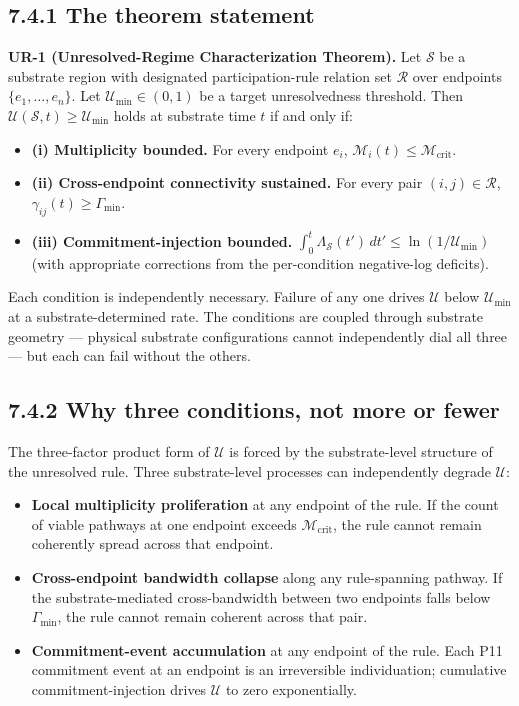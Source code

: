 \documentclass[11pt]{book}
\begin{document}
\subsection{7.4.1 The theorem statement}

\textbf{UR-1 (Unresolved-Regime Characterization Theorem).} Let $\mathcal{S}$ be a substrate region with designated participation-rule relation set $\mathcal{R}$ over endpoints $\{e_1, \ldots, e_n\}$. Let $\mathcal{U}_\mathrm{min} \in (0, 1)$ be a target unresolvedness threshold. Then $\mathcal{U}(\mathcal{S}, t) \geq \mathcal{U}_\mathrm{min}$ holds at substrate time $t$ if and only if:

\begin{itemize}
\item \textbf{(i) Multiplicity bounded.} For every endpoint $e_i$, $\mathcal{M}_i(t) \leq \mathcal{M}_\mathrm{crit}$.
\item \textbf{(ii) Cross-endpoint connectivity sustained.} For every pair $(i, j) \in \mathcal{R}$, $\gamma_{ij}(t) \geq \Gamma_\mathrm{min}$.
\item \textbf{(iii) Commitment-injection bounded.} $\int_0^t \Lambda_\mathcal{S}(t')\,dt' \leq \ln(1/\mathcal{U}_\mathrm{min})$ (with appropriate corrections from the per-condition negative-log deficits).
\end{itemize}

Each condition is independently necessary. Failure of any one drives $\mathcal{U}$ below $\mathcal{U}_\mathrm{min}$ at a substrate-determined rate. The conditions are coupled through substrate geometry — physical substrate configurations cannot independently dial all three — but each can fail without the others.

\subsection{7.4.2 Why three conditions, not more or fewer}

The three-factor product form of $\mathcal{U}$ is forced by the substrate-level structure of the unresolved rule. Three substrate-level processes can independently degrade $\mathcal{U}$:

\begin{itemize}
\item \textbf{Local multiplicity proliferation} at any endpoint of the rule. If the count of viable pathways at one endpoint exceeds $\mathcal{M}_\mathrm{crit}$, the rule cannot remain coherently spread across that endpoint.
\item \textbf{Cross-endpoint bandwidth collapse} along any rule-spanning pathway. If the substrate-mediated cross-bandwidth between two endpoints falls below $\Gamma_\mathrm{min}$, the rule cannot remain coherent across that pair.
\item \textbf{Commitment-event accumulation} at any endpoint of the rule. Each P11 commitment event at an endpoint is an irreversible individuation; cumulative commitment-injection drives $\mathcal{U}$ to zero exponentially.
\end{itemize}
\end{document}
